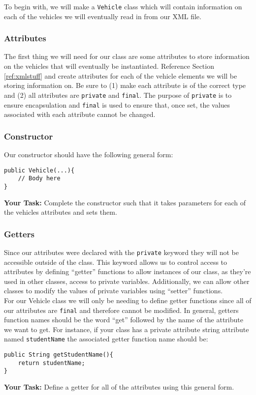 To begin with, we will make a \lstinline|Vehicle| class which will contain
information on each of the vehicles we will eventually read in from our XML
file. 


\subsubsection{Attributes}
The first thing we will need for our class are some attributes to store
information on the vehicles that will eventually be instantiated. Reference
Section \ref{ref:xmlstuff} and create attributes for each of the vehicle
elements we will be storing information on. Be sure to (1) make each attribute
is of the correct type and (2) all attributes are \lstinline|private| and
\lstinline|final|. The purpose of \lstinline|private| is to ensure
encapsulation and \lstinline|final| is used to ensure that, once set, the
values associated with each attribute cannot be changed.

\subsubsection{Constructor}
Our constructor should have the following general form:
\begin{lstlisting}
public Vehicle(...){
    // Body here
}
\end{lstlisting}
\textbf{Your Task: } Complete the constructor such that it takes parameters for
each of the vehicles attributes and sets them.

\subsubsection{Getters}\label{sec:getter}

Since our attributes were declared with the \lstinline|private| keyword they
will not be accessible outside of the class. This keyword allows us to control
access to attributes by defining ``getter'' functions to allow instances of our
class, as they're used in other classes, access to private variables.
Additionally, we can allow other classes to modify the values of private
variables using ``setter'' functions.\\

For our Vehicle class we will only be needing to define getter functions since
all of our attributes are \lstinline|final| and therefore cannot be modified. 
In general, getters function names should be the word ``get'' followed by the
name of the attribute we want to get. For instance, if your class has 
a private attribute string attribute named \lstinline|studentName| the associated
getter function name should be:
\begin{lstlisting}
public String getStudentName(){
    return studentName;
}
\end{lstlisting}
\textbf{Your Task:} Define a getter for all of the attributes using this general form.\\



